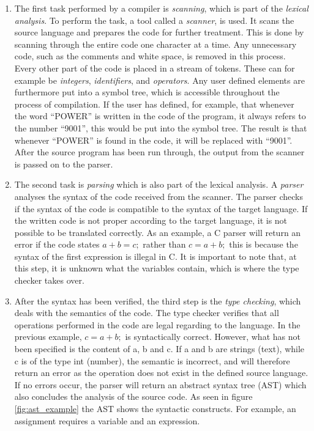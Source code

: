 \begin{enumerate}
	\item The first task performed by a compiler is \textit{scanning}, which is part of the \textit{lexical analysis}. To perform the task, a tool called a \textit{scanner}, is used. It scans the source language and prepares the code for further treatment. This is done by scanning through the entire code one character at a time. Any unnecessary code, such as the comments and white space, is removed in this process. Every other part of the code is placed in a stream of tokens. These can for example be \textit{integers}, \textit{identifiers}, and \textit{operators}. Any user defined elements are furthermore put into a symbol tree, which is accessible throughout the process of compilation. If the user has defined, for example, that whenever the word ``POWER'' is written in the code of the program, it always refers to the number ``9001'', this would be put into the symbol tree. The result is that whenever ``POWER'' is found in the code, it will be replaced with ``9001''. After the source program has been run through, the output from the scanner is passed on to the parser.
	
	\item The second task is \textit{parsing} which is also part of the lexical analysis. A \textit{parser} analyses the syntax of the code received from the scanner. The parser checks if the syntax of the code is compatible to the syntax of the target language. If the written code is not proper according to the target language, it is not possible to be translated correctly. As an example, a C parser will return an error if the code states $a + b = c;$ rather than $c = a + b;$ this is because the syntax of the first expression is illegal in C. It is important to note that, at this step, it is unknown what the variables contain, which is where the type checker takes over.

	\item After the syntax has been verified, the third step is the \textit{type checking}, which deals with the semantics of the code. The type checker verifies that all operations performed in the code are legal regarding to the language. In the previous example, $c = a + b;$ is syntactically correct. However, what has not been specified is the content of a, b and c. If a and b are strings (text), while c is of the type int (number), the semantic is incorrect, and will therefore return an error as the operation does not exist in the defined source language. If no errors occur, the parser will return an abstract syntax tree (AST) which also concludes the analysis of the source code. As seen in figure \ref{fig:ast_example} the AST shows the syntactic constructs. For example, an assignment requires a variable and an expression.
	

\end{enumerate}
